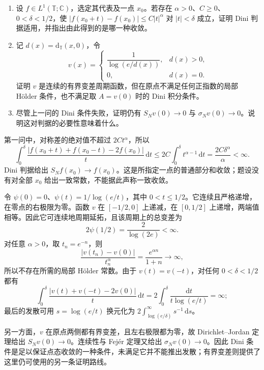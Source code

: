 \begin{exercise}\label{b2:ex:02-dini-holder-boundary}
\begin{enumerate}
 \item\label{b2:item:02-holder-implies-dini} 设 \(f\in L^1(\mathbb T;\mathbb C)\)，选定其代表及一点 \(x_0\)。若存在 \(\alpha>0\)、\(C\geq0\)、\(0<\delta<1/2\)，使 \(|f(x_0+t)-f(x_0)|\leq C|t|^\alpha\) 对 \(|t|<\delta\) 成立，证明 Dini 判据适用，并指出由此得到的是哪一种收敛。
 \item\label{b2:item:02-log-cusp} 记 \(d(x)=\mathrm d_{\mathbb T}(x,0)\)，令
 \[
 v(x)=\begin{cases}\dfrac1{\log(e/d(x))},&d(x)>0,\\0,&d(x)=0.\end{cases}
 \]
 证明 \(v\) 是连续的有界变差周期函数，但在原点不满足任何正指数的局部 Hölder 条件，也不满足取 \(A=v(0)\) 时的 Dini 积分条件。
 \item\label{b2:item:02-log-cusp-convergence} 尽管上一问的 Dini 条件失败，证明仍有 \(S_Nv(0)\to0\) 与 \(\sigma_Nv(0)\to0\)。说明这对判据的必要性意味着什么。
\end{enumerate}
\end{exercise}
\begin{solution}
第一问中，对称差的绝对值不超过 \(2Ct^\alpha\)，所以
\[
 \int_0^\delta\frac{|f(x_0+t)+f(x_0-t)-2f(x_0)|}{t}\,\mathrm dt
 \leq2C\int_0^\delta t^{\alpha-1}\,\mathrm dt
 =\frac{2C\delta^\alpha}{\alpha}<\infty.
\]
Dini 判据给出 \(S_Nf(x_0)\to f(x_0)\)。这是所指定一点的普通部分和收敛；题设没有对全部 \(x_0\) 给出一致常数，不能据此声称一致收敛。

令 \(\psi(0)=0\)、\(\psi(t)=1/\log(e/t)\)，其中 \(0<t\leq1/2\)。它连续且严格递增，在零点的右极限为零。函数 \(v\) 在 \([-1/2,0]\) 上递减，在 \([0,1/2]\) 上递增，两端值相等。因此它可连续地周期延拓，且该周期上的总变差为
\[
 2\psi(1/2)=\frac2{\log(2e)}<\infty.
\]
对任意 \(\alpha>0\)，取 \(t_n=e^{-n}\)，则
\[
 \frac{|v(t_n)-v(0)|}{t_n^\alpha}
 =\frac{e^{\alpha n}}{1+n}\longrightarrow\infty,
\]
所以不存在所需的局部 Hölder 常数。由于 \(v(t)=v(-t)\)，对任何 \(0<\delta<1/2\) 都有
\[
 \int_0^\delta\frac{|v(t)+v(-t)-2v(0)|}{t}\,\mathrm dt
 =2\int_0^\delta\frac{\mathrm dt}{t\log(e/t)}=\infty;
\]
最后的发散可用 \(s=\log(e/t)\) 换元化为 \(2\int_{\log(e/\delta)}^\infty s^{-1}\,\mathrm ds\)。

另一方面，\(v\) 在原点两侧都有界变差，且左右极限都为零，故 Dirichlet--Jordan 定理给出 \(S_Nv(0)\to0\)。连续性与 Fejér 定理又给出 \(\sigma_Nv(0)\to0\)。因此 Dini 条件是足以保证点态收敛的一种条件，未满足它并不能推出发散；有界变差则提供了这里仍可使用的另一条证明路线。
\end{solution}

